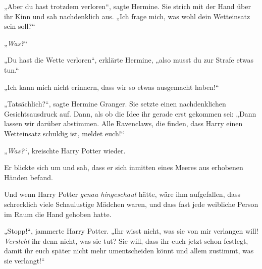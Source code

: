 „Aber du hast trotzdem verloren“, sagte Hermine. Sie strich mit der Hand über ihr Kinn und sah nachdenklich aus.
„Ich frage mich, was wohl dein Wetteinsatz sein soll?“

„\emph{Was?}“

„Du hast die Wette verloren“, erklärte Hermine, „also musst du zur Strafe etwas tun.“

„Ich kann mich nicht erinnern, dass wir so etwas ausgemacht haben!“

„Tatsächlich?“, sagte Hermine Granger. Sie setzte einen nachdenklichen Gesichtsausdruck auf. Dann, als ob die Idee ihr gerade erst gekommen sei:
„Dann lassen wir darüber abstimmen. Alle Ravenclaws, die finden, dass Harry einen Wetteinsatz schuldig ist, meldet euch!“

„\emph{Was?}“, kreischte Harry Potter wieder.

Er blickte sich um und sah, dass er sich inmitten eines Meeres aus erhobenen Händen befand.

Und wenn Harry Potter \emph{genau hingeschaut} hätte, wäre ihm aufgefallen, dass schrecklich viele Schaulustige Mädchen waren, und dass fast jede weibliche Person im Raum die Hand gehoben hatte.

„Stopp!“, jammerte Harry Potter.
„Ihr wisst nicht, was sie von mir verlangen will! \emph{Versteht} ihr denn nicht, was sie tut? Sie will, dass ihr euch jetzt schon festlegt, damit ihr euch später nicht mehr umentscheiden könnt und allem zustimmt, was sie verlangt!“

